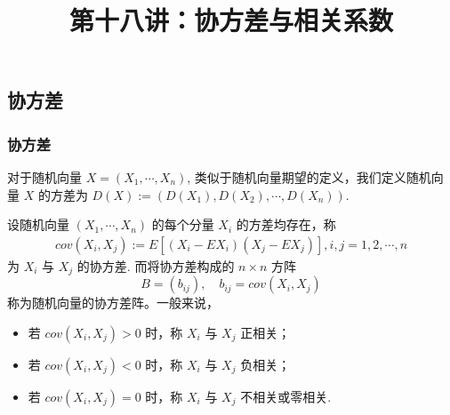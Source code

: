 \title[概率论]{第十八讲：协方差与相关系数}
\date{}

{ 
	\begin{frame}
		\titlepage
	\end{frame}
}
\subsection{协方差}
\begin{frame}
	\frametitle{协方差}
	\begin{defi}
		对于随机向量 $X=(X_1,\cdots,X_n)$, 类似于随机向量期望的定义，我们定义随机向量 $X$ 的方差为 $D (X):=(D (X_1),D (X_2),\cdots, D (X_n))$.
	\end{defi}

	\pause
	\begin{defi}
		设随机向量 $(X_1,\cdots,X_n)$ 的每个分量 $X_i$ 的方差均存在，称
		\begin{eqnarray*}
			cov(X_i,X_j):=E[(X_i-EX_i)(X_j-EX_j)], i,j=1,2,\cdots,n
		\end{eqnarray*}
		为 $X_i$ 与 $X_j$ 的协方差. \pause 而将协方差构成的 $n\times n$ 方阵
		$$B=(b_{ij}),\quad b_{ij}=cov (X_i,X_j)$$ 称为随机向量的协方差阵。一般来说，\pause
		\begin{itemize}[<+-|alert@+>]
			\item 若 $cov (X_i,X_j)>0$ 时，称 $X_i$ 与 $X_j$ 正相关；
			\item 若 $cov (X_i,X_j)<0$ 时，称 $X_i$ 与 $X_j$ 负相关；
			\item 若 $cov (X_i,X_j)=0$ 时，称 $X_i$ 与 $X_j$ 不相关或零相关.
		\end{itemize}
	\end{defi}
\end{frame}

